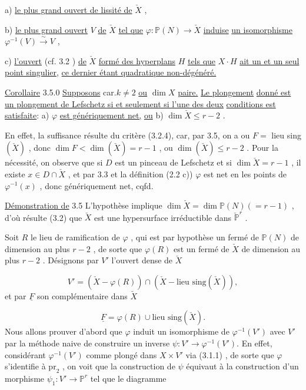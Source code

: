 a) \underline{le plus grand ouvert de lissité de} $\check{X}$ ,

b) \underline{le plus grand ouvert} $V$ \underline{de} $\check{X}$ \underline{tel que} $\varphi : \mathbb{P}(N) \longrightarrow \check{X}$ \underline{induise} \underline{un isomorphisme} $\varphi^{-1}(V) \stackrel{\sim}{\longrightarrow} V$ ,

c) \underline{l'ouvert} (cf. 3.2 ) \underline{de} $\check{X}$ \underline{formé des hyperplans} $H$ \underline{tels que} $X \cdot H$ \underline{ait un et un seul point singulier,} \underline{ce dernier étant quadratique non-dégénéré.}

\underline{Corollaire} 3.5.0 \underline{Supposons} car.$k \neq 2$ \underline{ou} $\dim X$ \underline{paire.} \underline{Le plongement} \underline{donné est un plongement de Lefschetz si et seulement si l'une des deux} \underline{conditions est satisfaite}: a) $\varphi$ \underline{est génériquement net,} \underline{ou} b) $\dim \check{X} \leqslant r-2$ .

En effet, la suffisance résulte du critère (3.2.4), car, par 3.5, on a ou $F =$ lieu sing$(\check{X})$ , donc $\dim F < \dim(\check{X}) = r-1$ , ou $\dim(\check{X}) \leqslant r-2$ . Pour la nécessité, on observe que si $D$ est un pinceau de Lefschetz et si $\dim \check{X} = r-1$ , il existe $x \in D \cap \check{X}$ , et par 3.3 et la définition (2.2 c)) $\varphi$ est net en les points de $\varphi^{-1}(x)$ , donc génériquement net, cqfd.

\underline{Démonstration de} 3.5 L'hypothèse implique $\dim \check{X} = \dim \mathbb{P}(N)(=r-1)$ , d'où résulte (3.2) que $\check{X}$ est une hypersurface irréductible dans $\check{\mathbb{P}}^r$ .



Soit $R$ le lieu de ramification de $\varphi$ , qui est par hypothèse un fermé de $\mathbb{P}(N)$ de dimension au plus $r-2$ , de sorte que $\varphi(R)$ est un fermé de $\check{X}$ de dimension au plus $r-2$ . Désignons par $V'$ l'ouvert dense de $\check{X}$

\begin{equation}\tag{3.5.1}
V' = (\check{X} - \varphi(R)) \cap (\check{X} - \text{lieu sing}(\check{X})) ,
\end{equation}
et par $\underline{F}$ son complémentaire dans $\check{X}$

\begin{equation}\tag{3.5.1.1}
\underline{F} = \varphi(R) \cup \text{lieu sing}(\check{X}) .
\end{equation}
Nous allons prouver d'abord que $\varphi$ induit un isomorphisme de $\varphi^{-1}(V')$ avec $V'$ par la méthode naive de construire un inverse $\psi : V' \longrightarrow \varphi^{-1}(V')$. En effet, considérant $\varphi^{-1}(V')$ comme plongé dans $X \times V'$ via (3.1.1) , de sorte que $\varphi$ s'identifie à $\mathrm{pr}_2$ , on voit que la construction de $\psi$ équivaut à la construction d'un morphisme $\psi_1 : V' \longrightarrow \mathbb{P}^r$ tel que le diagramme

